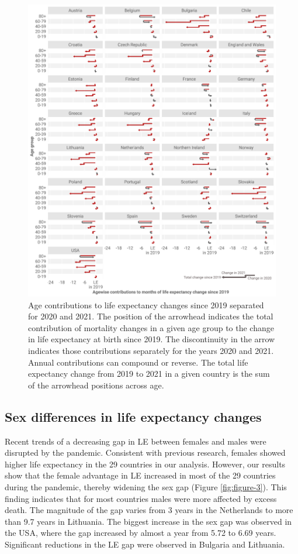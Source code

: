 \documentclass[12pt]{article}
\begin{document}
\begin{figure}[ht!]
    \centering
    \includegraphics{figure-2.pdf}
    \caption{Age contributions to life expectancy changes since 2019 separated for 2020 and 2021. The position of the arrowhead indicates the total contribution of mortality changes in a given age group to the change in life expectancy at birth since 2019. The discontinuity in the arrow indicates those contributions separately for the years 2020 and 2021. Annual contributions can compound or reverse. The total life expectancy change from 2019 to 2021 in a given country is the sum of the arrowhead positions across age.}
    \label{fig:figure-2}
\end{figure}

\subsection*{Sex differences in life expectancy changes}

Recent trends of a decreasing gap in LE between females and males\citealp{Zarulli2021} were disrupted by the pandemic. Consistent with previous research, females showed higher life expectancy in the 29 countries in our analysis. However, our results show that the female advantage in LE increased in most of the 29 countries during the pandemic, thereby widening the sex gap (Figure \ref{fig:figure-3}). This finding indicates that for most countries males were more affected by excess death. The magnitude of the gap varies from 3 years in the Netherlands to more than 9.7 years in Lithuania. The biggest increase in the sex gap was observed in the USA, where the gap increased by almost a year from 5.72 to 6.69 years. Significant reductions in the LE gap were observed in Bulgaria and Lithuania.
\end{document}
